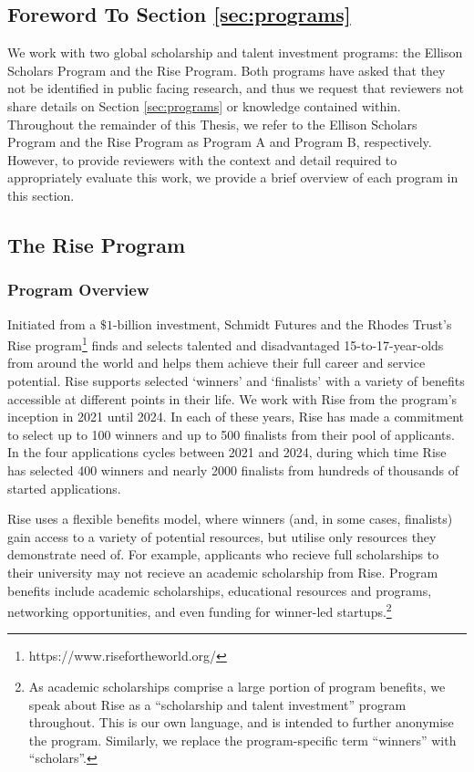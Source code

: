 \subsection{Foreword To Section \ref{sec:programs}}
We work with two global scholarship and talent investment programs: the Ellison Scholars Program and the Rise Program. Both programs have asked that they not be identified in public facing research, and thus we request that reviewers not share details on Section \ref{sec:programs} or knowledge contained within. Throughout the remainder of this Thesis, we refer to the Ellison Scholars Program and the Rise Program as Program A and Program B, respectively. However, to provide reviewers with the context and detail required to appropriately evaluate this work, we provide a brief overview of each program in this section.

\subsection{The Rise Program}\label{ssec:rise}
\subsubsection{Program Overview}
Initiated from a $\$1$-billion investment, Schmidt Futures and the Rhodes Trust's Rise program\footnote{https://www.risefortheworld.org/} finds and selects talented and disadvantaged 15-to-17-year-olds from around the world and helps them achieve their full career and service potential. Rise supports selected `winners' and `finalists' with a variety of benefits accessible at different points in their life. We work with Rise from the program's inception in 2021 until 2024. In each of these years, Rise has made a commitment to select up to 100 winners and up to 500 finalists from their pool of applicants. In the four applications cycles between 2021 and 2024, during which time Rise has selected 400 winners and nearly 2000 finalists from hundreds of thousands of started applications.

Rise uses a flexible benefits model, where winners (and, in some cases, finalists) gain access to a variety of potential resources, but utilise only resources they demonstrate need of. For example, applicants who recieve full scholarships to their university may not recieve an academic scholarship from Rise. Program benefits include academic scholarships, educational resources and programs, networking opportunities, and even funding for winner-led startups.\footnote{As academic scholarships comprise a large portion of program benefits, we speak about Rise as a ``scholarship and talent investment'' program throughout. This is our own language, and is intended to further anonymise the program. Similarly, we replace the program-specific term ``winners'' with ``scholars''.}

